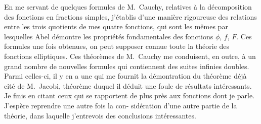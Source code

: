 \documentclass[11pt,a4paper]{article}
\begin{document}
En me servant de quelques formules de M.~Cauchy, relatives \`a la d\'ecomposition
des fonctions en fractions simples, j'\'etablis d'une mani\`ere rigoureuse des relations entre
les trois quotients de mes quatre fonctions, qui sont les m\^emes par lesquelles Abel
d\'emontre les propri\'et\'es fondamentales des fonctions $\phi$, $f$, $F$. Ces formules une fois
obtenues, on peut supposer connue toute la th\'eorie des fonctions elliptiques. Ces
th\'eor\`emes de M.~Cauchy me conduisent, en outre, \`a un grand nombre de nouvelles
formules qui contiennent des suites infinies doubles. Parmi celles-ci, il y en a une
qui me fournit la d\'emontration du th\'eor\`eme d\'ej\`a cit\'e de M.~Jacobi, th\'eor\`eme duquel
il d\'eduit une foule de r\'esultats int\'eressants. Je finis en citant ceux qui se rapportent
de plus pr\`es aux fonctions dont je parle. J'esp\`ere reprendre une autre fois la con-
sid\'eration d'une autre partie de la th\'eorie, dans laquelle j'entrevois des conclusions
int\'eressantes.
\end{document}
